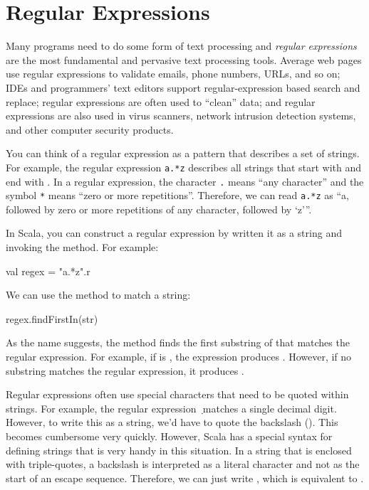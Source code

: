 \documentclass[9pt]{extbook}
\begin{document}
\section{Regular Expressions}

Many programs need to do some form of text processing and \emph{regular expressions} are the most fundamental and pervasive text processing tools. Average web pages use regular expressions to validate emails, phone numbers, URLs, and so on; IDEs and programmers' text editors support regular-expression based search and replace; regular expressions are often used to ``clean'' data; and regular expressions are also used in virus scanners, network intrusion detection systems, and other computer security products.

You can think of a regular expression as a pattern that describes a set of strings. For example, the regular expression \texttt{a.*z} describes all strings that start with  and end with . In a regular expression, the character \texttt{.} means ``any character'' and the symbol \texttt{*} means ``zero or more repetitions''. Therefore, we can read \texttt{a.*z} as ``a, followed by zero or more repetitions of any character, followed by `z'''.

In Scala, you can construct a regular expression by written it as a string and invoking the  method. For example:
\begin{scalacode}
val regex = "a.*z".r
\end{scalacode}

We can use the  method to match a string:
\begin{scalacode}
regex.findFirstIn(str)
\end{scalacode}
As the name suggests, the method finds the first substring of  that matches the regular expression. For example, if  is , the expression produces . However, if no substring matches the regular expression, it produces .

\begin{notation}
Regular expressions often use special characters that need to be quoted within strings. For example, the regular expression \texttt{\d} matches a single decimal digit. However, to write this as a string, we'd have to quote the backslash (). This becomes cumbersome very quickly. However, Scala has a special syntax for defining strings that is very handy in this situation. In a  string that is enclosed with triple-quotes, a backslash is interpreted as a literal character and not as the start of an escape sequence. Therefore, we can just write , which is equivalent to .
\end{notation}
\end{document}
